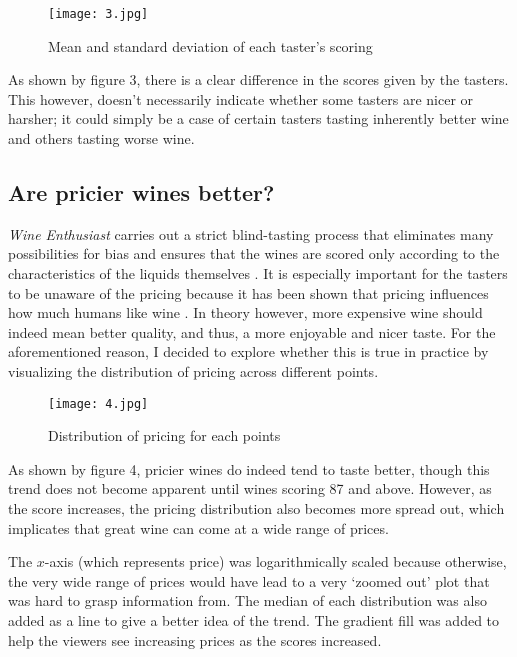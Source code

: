 \begin{figure}[h]
  \texttt{[image: 3.jpg]} 
  \caption{Mean and standard deviation of each taster's scoring} %
\end{figure}

As shown by figure 3, there is a clear difference in the scores given by the tasters. This however, doesn't necessarily indicate whether some tasters are nicer or harsher; it could simply be a case of certain tasters tasting inherently better wine and others tasting worse wine.

\subsection{Are pricier wines better?}
\emph{Wine Enthusiast} carries out a strict blind-tasting process that eliminates many possibilities for bias and ensures that the wines are scored only according to the characteristics of the liquids themselves \cite{WineMag}. It is especially important for the tasters to be unaware of the pricing because it has been shown that pricing influences how much humans like wine \cite{SchmidtSkvortsova2017}. In theory however, more expensive wine should indeed mean better quality, and thus, a more enjoyable and nicer taste. For the aforementioned reason, I decided to explore whether this is true in practice by visualizing the distribution of pricing across different points.


\begin{figure}[h]
  \texttt{[image: 4.jpg]}
  \caption{Distribution of pricing for each points} %
\end{figure}

As shown by figure 4, pricier wines do indeed tend to taste better, though this trend does not become apparent until wines scoring 87 and above. However, as the score increases, the pricing distribution also becomes more spread out, which implicates that great wine can come at a wide range of prices.

The $x$-axis (which represents price) was logarithmically scaled because otherwise, the very wide range of prices would have lead to a very `zoomed out' plot that was hard to grasp information from. The median of each distribution was also added as a line to give a better idea of the trend. The gradient fill was added to help the viewers see increasing prices as the scores increased.

